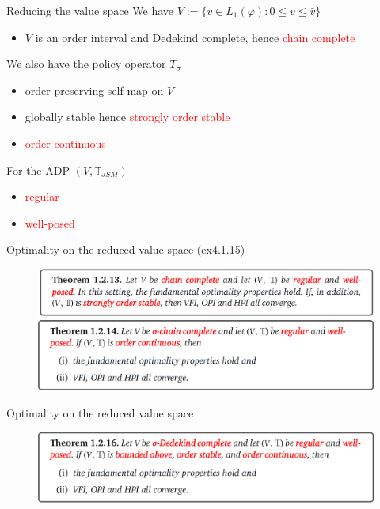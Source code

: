 \begin{frame}{Reducing the value space}
We have $V:= \{v\in L_1(\varphi): 0\le v\le \bar v\}$
\begin{itemize}
    \item $V$ is an order interval and Dedekind complete, hence \textcolor{red}{chain complete}
\end{itemize}
We also have the policy operator $T_\sigma$
\begin{itemize}
    \item order preserving self-map on $V$
    \item globally stable hence \textcolor{red}{strongly order stable}
    \item \textcolor{red}{order continuous}
\end{itemize}
For the ADP $(V,\mathbb{T}_{JSM})$
\begin{itemize}
    \item \textcolor{red}{regular}
    \item \textcolor{red}{well-posed}
\end{itemize}
\end{frame}

\begin{frame}{Optimality on the reduced value space (ex4.1.15)}
    \begin{figure}
        \centering
        \includegraphics[width=1\linewidth]{Dynamic Programming/DP2/Chapter 4/Section 4.1.1. Job Search/thm1213new.png}
        \includegraphics[width=1\linewidth]{Dynamic Programming/DP2/Chapter 4/Section 4.1.1. Job Search/thm1214new.png}
    \end{figure}
\end{frame}

\begin{frame}{Optimality on the reduced value space}
\begin{figure}
    \centering
    \includegraphics[width=1\linewidth]{Dynamic Programming/DP2/Chapter 4/Section 4.1.1. Job Search/thm1216.png}
\end{figure}    
\end{frame}

